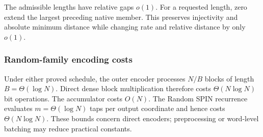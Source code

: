 The admissible lengths have relative gaps $o(1)$. For a requested length, zero
extend the largest preceding native member. This preserves injectivity and
absolute minimum distance while changing rate and relative distance by only
$o(1)$.

\subsubsection{Random-family encoding costs}

Under either proved schedule, the outer encoder processes \(N/B\) blocks of
length \(B=\Theta(\log N)\). Direct dense block multiplication therefore
costs \(\Theta(N\log N)\) bit operations. The accumulator costs \(O(N)\).
The Random SPIN recurrence evaluates \(m=\Theta(\log N)\) taps per output
coordinate and hence costs \(\Theta(N\log N)\). These bounds concern direct
encoders; preprocessing or word-level batching may reduce practical constants.
